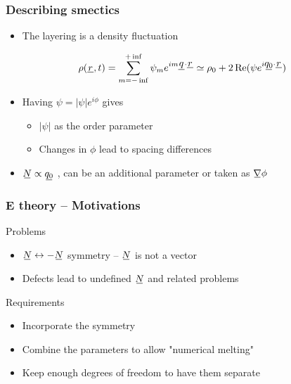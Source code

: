 \documentclass[10pt,mathserif]{beamer}
\begin{document}
\begin{frame}
    \frametitle{Describing smectics}
    \begin{itemize}
        \item The layering is a density fluctuation
    \end{itemize}
    \begin{align*}
        \rho(\su{r}, t) = \sum_{m=-\inf}^{+\inf} \psi_m e^{im\su{q}\cdot\su{r}} \simeq \rho_0 + 2\Re(\psi e^{i\su{q_0}\cdot\su{r}})
    \end{align*}
    \begin{itemize}
        \item Having $\psi = |\psi|e^{i\phi}$ gives
            \begin{itemize}
                \item $|\psi|$ as the order parameter
                \item Changes in $\phi$ lead to spacing differences
            \end{itemize}
        \item $\su{N} \propto \su{q_0}$ \color{gray}, can be an additional parameter or taken as $\su{\nabla} \phi$ \normalcolor
    \end{itemize}
\end{frame}

\begin{frame}
    \frametitle{E theory -- Motivations}
    \large
    Problems
    \normalsize
    \begin{itemize}
        \item $\su{N} \leftrightarrow -\su{N}$ symmetry -- $\su{N}$ is not a vector
        \item Defects lead to undefined $\su{N}$ \color{gray} and related problems \normalcolor
    \end{itemize}

    \vspace{3em}

    \large
    Requirements
    \normalsize
    \begin{itemize}
        \item Incorporate the symmetry
        \item Combine the parameters to allow "numerical melting"
        \item Keep enough degrees of freedom to have them separate
    \end{itemize}
\end{frame}
\end{document}
